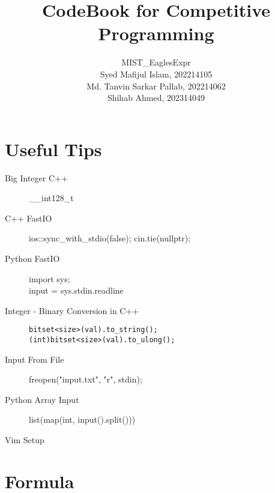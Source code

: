\documentclass[10pt, a4paper]{article}
\title{CodeBook for Competitive Programming}
\author{MIST\_EaglesExpr\\[1cm] Syed Mafijul Islam, 202214105\\
Md. Tanvin Sarkar Pallab, 202214062\\
Shihab Ahmed, 202314049
}
\begin{document}
\maketitle
\thispagestyle{empty}

\begin{multicols}{2}

\tableofcontents
\newpage


\section{Useful Tips}
\begin{description}
    \item[Big Integer C++] \_\_int128\_t
    \item[C++ FastIO] \hfill \break
    ios::sync\_with\_stdio(false);
    cin.tie(nullptr);
    \item[Python FastIO] \hfill \break
    import sys; \\
    input = sys.stdin.readline
    \item[Integer - Binary Conversion in C++] \hfill
    \begin{lstlisting}
bitset<size>(val).to_string();
(int)bitset<size>(val).to_ulong();
    \end{lstlisting}
    \item[Input From File] \hfill \break
    freopen("input.txt", "r", stdin);
    \item[Python Array Input] \hfill \break
    list(map(int, input().split()))
    \item [Vim Setup] \hfill
    
\end{description}

\section{Formula}

\end{multicols}
\end{document}
